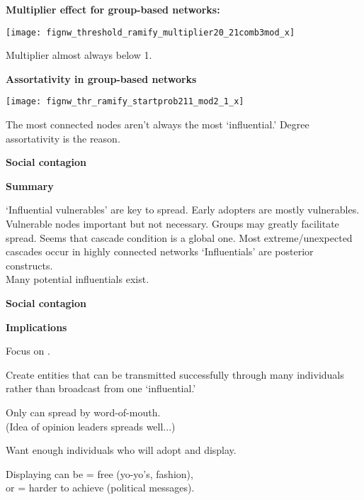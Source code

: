 {{{{    \textbf{Multiplier effect for group-based networks:}

    
      \centering
      \texttt{[image: fignw\_threshold\_ramify\_multiplier20\_21comb3mod\_x]}
      
       Multiplier almost always below 1.
      
    



  \textbf{Assortativity in group-based networks}


  
    \centering
    \texttt{[image: fignw\_thr\_ramify\_startprob211\_mod2\_1\_x]}
    
     The most connected nodes aren't always the most `influential.'
     \alert{Degree assortativity} is the reason.
    
  
  

  \textbf{Social contagion}

  \textbf{Summary}
    

     \alert{`Influential vulnerables'} are key to spread.
     Early adopters are mostly vulnerables.
     Vulnerable nodes important but not necessary.
     Groups may greatly facilitate spread.
     Seems that cascade condition is a global one.
     Most extreme/unexpected cascades occur in highly connected networks 
     `Influentials' are posterior constructs.\\
     Many potential influentials exist.
    
  
  

  \textbf{Social contagion}

  \textbf{Implications}
  
  
    Focus on .
  
    Create entities that can be transmitted successfully
    through many individuals rather than broadcast from one `influential.'
  
    Only  can spread by word-of-mouth.\\
    \qquad (Idea of opinion leaders spreads well...)
  
    Want enough individuals who will adopt and display.
  
    Displaying can be  = free (yo-yo's, fashion),\\
    or  = harder to achieve (political messages).
  
}}}}

